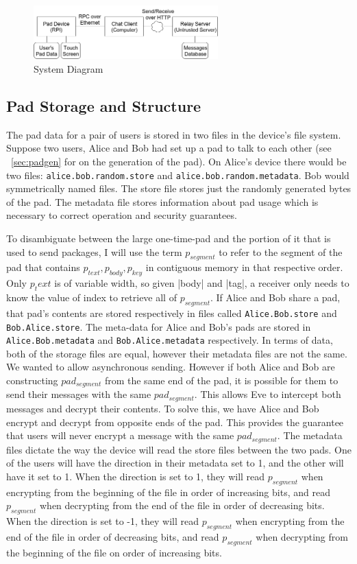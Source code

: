 \documentclass[twocolumn]{article}
\begin{document}
\begin{figure}[htp]
\centering
\includegraphics[width=2.8in]{system-diagram}
\caption{System Diagram}
\end{figure}

\subsection{Pad Storage and Structure}
The pad data for a pair of users is stored in two files in the device's file system. Suppose two users, Alice and Bob had set up a pad to talk to each other (see ~\ref{sec:padgen} for on the generation of the pad). On Alice's device there would be two files: \texttt{alice.bob.random.store} and \texttt{alice.bob.random.metadata}. Bob would symmetrically named files. The store file stores just the randomly generated bytes of the pad. The metadata file stores information about pad usage which is necessary to correct operation and security guarantees.

To disambiguate between the large one-time-pad and the portion of it that is used to send packages, I will use the term $p_{segment}$ to refer to the segment of the pad that contains $p_{text}, p_{body}, p_{key}$ in contiguous memory in that respective order.  Only ${p_text}$ is of variable width, so given |body| and |tag|, a receiver only needs to know the value of index to retrieve all of $p_{segment}$.
If Alice and Bob share a pad, that pad's contents are stored respectively in files called \texttt{Alice.Bob.store} and \texttt{Bob.Alice.store}. The meta-data for Alice and Bob's pads are stored in \texttt{Alice.Bob.metadata} and \texttt{Bob.Alice.metadata} respectively. In terms of data, both of the storage files are equal, however their metadata files are not the same. We wanted to allow asynchronous sending. However if both Alice and Bob are constructing $pad_{segment}$ from the same end of the pad, it is possible for them to send their messages with the same $pad_{segment}$. This allows Eve to intercept both messages and decrypt their contents. To solve this, we have Alice and Bob encrypt and decrypt from opposite ends of the pad. This provides the guarantee that users will never encrypt a message with the same $pad_{segment}$. The metadata files dictate the way the device will read the store files between the two pads. One of the users will have the direction in their metadata set to 1, and the other will have it set to 1. When the direction is set to 1, they will read $p_{segment}$ when encrypting from the beginning of the file in order of increasing bits, and read $p_{segment}$ when decrypting from the end of the file in order of decreasing bits. When the direction is set to -1, they will read $p_{segment}$ when encrypting from the end of the file in order of decreasing bits, and read $p_{segment}$ when decrypting from the beginning of the file on order of increasing bits.
\end{document}
